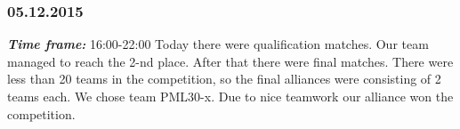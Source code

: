\subsubsection{05.12.2015}
\textit{\textbf{Time frame:}} 16:00-22:00 \newline
Today there were qualification matches. Our team managed to reach the 2-nd place. After that there were final matches. There were less than 20 teams in the competition, so the final alliances were consisting of 2 teams each. We chose team PML30-x. Due to nice teamwork our alliance won the competition.

\begin{figure}[H]
	\begin{minipage}[h]{0.58\linewidth}

\end{minipage}
\end{figure}
